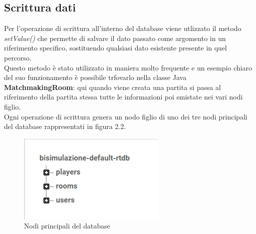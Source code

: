 \documentclass[a4paper,11pt,twoside,openright]{report}
\begin{document}
\subsection{Scrittura dati}
Per l'operazione di scrittura all'interno del database viene utlizzato il metodo \textit{setValue()}\cite{8} che permette di salvare il dato passato come argomento in un riferimento specifico, sostituendo qualsiasi dato esistente presente in quel percorso.\\
Questo metodo è stato utilizzato in maniera molto frequente e un esempio chiaro del suo funzionamento è possibile trfovarlo nella classe Java \textbf{MatchmakingRoom}: qui quando viene creata una partita si passa al riferimento della partita stessa tutte le informazioni poi smistate nei vari nodi figlio.\\
Ogni operazione di scrittura genera un nodo figlio di uno dei tre nodi principali del database rappresentati in figura 2.2.

\begin{figure}[h]
\includegraphics{images/Main nodes.png}
\caption{Nodi principali del database}
\end{figure}
\end{document}
